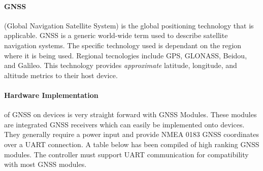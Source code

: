 \documentclass[12pt]{article}
\begin{document}
\paragraph{GNSS} (Global Navigation Satellite System) is the global positioning technology that is applicable. GNSS is a generic world-wide term used to describe satellite navigation systems. The specific technology used is dependant on the region where it is being used. Regional tecnologies include GPS, GLONASS, Beidou, and Galileo.  This technology provides \textit{approximate} latitude, longitude, and altitude metrics to their host device. 

\paragraph{Hardware Implementation} of GNSS on devices is very straight forward with GNSS Modules. These modules are integrated GNSS receivers which can easily be implemented onto devices. They generally require a power input and provide NMEA 0183 GNSS coordinates over a UART connection. A table below has been compiled of high ranking GNSS modules. The controller must support UART communication for compatibility with most GNSS modules.

\clearpage
\end{document}
